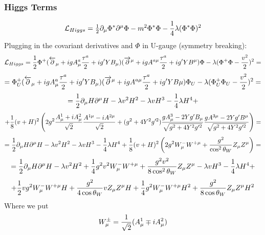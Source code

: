\subsubsection{Higgs Terms}

\begin{equation*}
  {\mathcal L}_{Higgs}= {\textstyle{1\over2}} \partial_\mu\Phi^*\partial^\mu\Phi-m^2\Phi^*\Phi-{1\over4} \lambda(\Phi^*\Phi)^2
\end{equation*}
Plugging in the covariant derivatives and $\Phi$ in U-gauge (symmetry breaking): 
\begin{equation*}
  {\mathcal L}_{Higgs} = {1\over2}\Phi^+(\overleftarrow\partial_\mu+igA^a_\mu {\tau^a\over 2} + ig'YB_\mu) (\overrightarrow\partial^\mu+igA^{a\mu} {\tau^a\over 2} + ig'YB^\mu)\Phi -\lambda(\Phi^+\Phi-{v^2\over2})^2=
\end{equation*}
\begin{equation*}
  = \Phi^+_U(\overleftarrow\partial_\mu+igA^a_\mu {\tau^a\over 2} + ig'YB_\mu) (\overrightarrow\partial^\mu+igA^{a\mu} {\tau^a\over 2} + ig'YB\mu)\Phi_U -\lambda(\Phi^+_U\Phi_U-{v^2\over2})^2 =
\end{equation*}
\begin{equation*}
  = {1\over2}\partial_\mu H\partial^\mu H - \lambda v^2 H^2 - \lambda v H^3 - {1\over 4}\lambda H^4 +
\end{equation*}
\begin{equation*}
  +{1\over 8}(v+H)^2 \left(2g^2{A^1_\mu+iA^2_\mu\over\sqrt2}{A^{1\mu}-iA^{2\mu}\over\sqrt2} + (g^2+4Y^2g'^2){gA^3_\mu-2Yg'B_\mu\over\sqrt{g^2+4Y^2g'^2}} {gA^{3\mu}-2Yg'B^\mu\over\sqrt{g^2+4Y^2g'^2}}\right) =
\end{equation*}
\begin{equation*}
  = {1\over2}\partial_\mu H\partial^\mu H - \lambda v^2 H^2 - \lambda v H^3 - {1\over 4}\lambda H^4 + {1\over 8}(v+H)^2 \left(2g^2W^-_\mu W^{+\mu} + {g^2\over\cos^2\theta_W}Z_\mu Z^\mu\right) =
\end{equation*}
\begin{equation*}
  = {1\over2}\partial_\mu H\partial^\mu H - \lambda v^2 H^2 +{1\over4}g^2v^2W^-_\mu W^{+\mu}+{g^2v^2\over8\cos^2\theta_W}Z_\mu Z^\mu - \lambda v H^3 - {1\over 4}\lambda H^4 +
\end{equation*}
\begin{equation*}
  +{1\over2}vg^2W_\mu^-W^{+\mu}H +{g^2\over4\cos\theta_W}vZ_\mu Z^\mu H +{1\over4}g^2W_\mu^-W^{+\mu}H^2 +{g^2\over8\cos\theta_W}Z_\mu Z^\mu H^2
\end{equation*}
Where we put 
\begin{equation*}
  W^{\pm}_\mu = {1\over\sqrt2}(A^1_\mu \mp iA^2_\mu)
\end{equation*}
